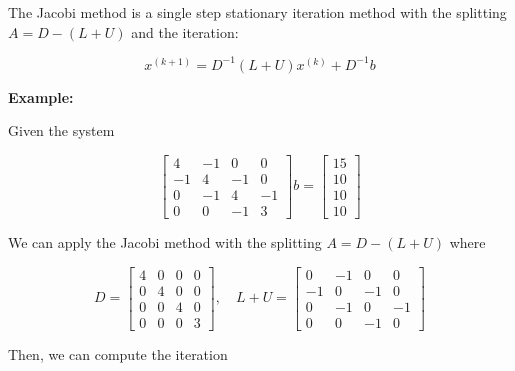 The Jacobi method is a single step stationary iteration method with the splitting 
\(A = D - (L + U)\) and the iteration:

\[
    x^{(k + 1)} = D^{-1}(L + U)x^{(k)} + D^{-1}b
\]

\textbf{Example:}

Given the system 

\[
    \begin{bmatrix}
        4 & -1 & 0 & 0 \\ 
        -1 & 4 & -1 & 0 \\ 
        0 & -1 & 4 & -1 \\ 
        0 & 0 & -1 & 3
    \end{bmatrix}
    b = 
    \begin{bmatrix}
        15 \\ 
        10 \\ 
        10 \\ 
        10
    \end{bmatrix}
\]

We can apply the Jacobi method with the splitting \(A = D - (L + U)\) where

\[
    D = 
    \begin{bmatrix}
        4 & 0 & 0 & 0 \\ 
        0 & 4 & 0 & 0 \\ 
        0 & 0 & 4 & 0 \\ 
        0 & 0 & 0 & 3
    \end{bmatrix}
    , \quad 
    L + U = 
    \begin{bmatrix}
        0 & -1 & 0 & 0 \\ 
        -1 & 0 & -1 & 0 \\ 
        0 & -1 & 0 & -1 \\ 
        0 & 0 & -1 & 0
    \end{bmatrix}
\]

Then, we can compute the iteration

